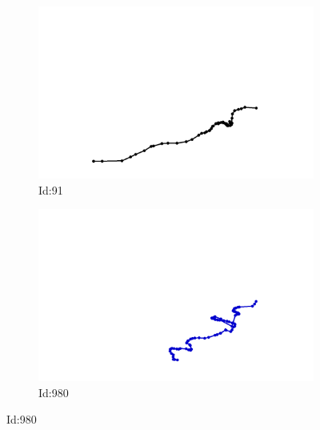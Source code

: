 \documentclass[12pt,twoside]{report}
\begin{document}
\begin{figure}
\centering
\begin{subfigure}[b]{0.20\textwidth}
\centering
\includegraphics[width=\textwidth]{../../trajectories/91.png}
\caption{Id:91}
\end{subfigure}
\begin{subfigure}[b]{0.20\textwidth}
\centering
\includegraphics[width=\textwidth]{../../trajectories/980.png}
\caption{Id:980}
\end{subfigure}
\end{figure}
\end{document}
